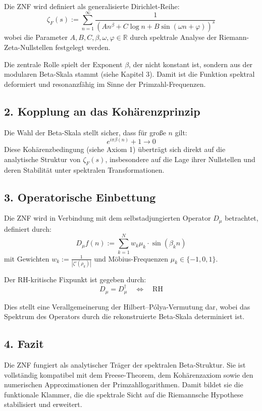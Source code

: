 \documentclass[a4paper,12pt]{article}
\begin{document}
\begin{center}
Die ZNF wird definiert als generalisierte Dirichlet-Reihe:
\[
\zeta_F(s) := \sum_{n=1}^\infty \frac{1}{(A n^{\beta} + C \log n + B \sin(\omega n + \varphi))^s}
\]
wobei die Parameter \( A, B, C, \beta, \omega, \varphi \in \mathbb{R} \) durch spektrale Analyse der Riemann-Zeta-Nullstellen festgelegt werden.

Die zentrale Rolle spielt der Exponent \(\beta\), der nicht konstant ist, sondern aus der modularen Beta-Skala stammt (siehe Kapitel 3). Damit ist die Funktion spektral deformiert und resonanzfähig im Sinne der Primzahl-Frequenzen.

\subsection*{2. Kopplung an das Kohärenzprinzip}

Die Wahl der Beta-Skala stellt sicher, dass für große \( n \) gilt:
\[
e^{i \pi \beta(n)} + 1 \to 0
\]
Diese Kohärenzbedingung (siehe Axiom 1) überträgt sich direkt auf die analytische Struktur von \( \zeta_F(s) \), insbesondere auf die Lage ihrer Nullstellen und deren Stabilität unter spektralen Transformationen.

\subsection*{3. Operatorische Einbettung}

Die ZNF wird in Verbindung mit dem selbstadjungierten Operator \( D_\mu \) betrachtet, definiert durch:
\[
D_\mu f(n) := \sum_{k=1}^N w_k \mu_k \cdot \sin(\beta_k n)
\]
mit Gewichten \( w_k := \frac{1}{|\zeta'(\rho_k)|} \) und Möbius-Frequenzen \( \mu_k \in \{-1, 0, 1\} \).

Der RH-kritische Fixpunkt ist gegeben durch:
\[
D_\mu = D_\mu^\dagger \quad \Leftrightarrow \quad \text{RH}
\]

Dies stellt eine Verallgemeinerung der Hilbert–Pólya-Vermutung dar, wobei das Spektrum des Operators durch die rekonstruierte Beta-Skala determiniert ist.

\subsection*{4. Fazit}

Die ZNF fungiert als analytischer Träger der spektralen Beta-Struktur. Sie ist vollständig kompatibel mit dem Freese-Theorem, dem Kohärenzaxiom sowie den numerischen Approximationen der Primzahllogarithmen. Damit bildet sie die funktionale Klammer, die die spektrale Sicht auf die Riemannsche Hypothese stabilisiert und erweitert.


\end{center}
\end{document}
